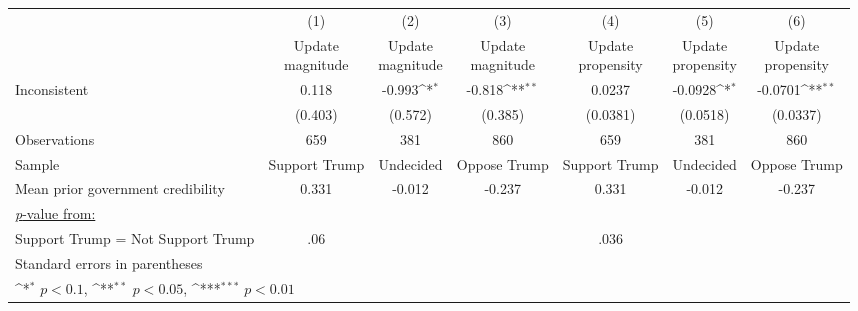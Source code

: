 {
\def\sym#1{\ifmmode^{#1}\else\(^{#1}\)\fi}
\begin{tabular}{l*{6}{c}}
\hline\hline
                    &\multicolumn{1}{c}{(1)}         &\multicolumn{1}{c}{(2)}         &\multicolumn{1}{c}{(3)}         &\multicolumn{1}{c}{(4)}         &\multicolumn{1}{c}{(5)}         &\multicolumn{1}{c}{(6)}         \\
                    &\shortstack{Update \\ magnitude}         &\shortstack{Update \\ magnitude}         &\shortstack{Update \\ magnitude}         &\shortstack{Update \\ propensity}         &\shortstack{Update \\ propensity}         &\shortstack{Update \\ propensity}         \\
\hline
Inconsistent        &       0.118         &      -0.993\sym{*}  &      -0.818\sym{**} &      0.0237         &     -0.0928\sym{*}  &     -0.0701\sym{**} \\
                    &     (0.403)         &     (0.572)         &     (0.385)         &    (0.0381)         &    (0.0518)         &    (0.0337)         \\
\hline
Observations        &         659         &         381         &         860         &         659         &         381         &         860         \\
Sample              &Support Trump         &   Undecided         &Oppose Trump         &Support Trump         &   Undecided         &Oppose Trump         \\
Mean prior government credibility&       0.331         &      -0.012         &      -0.237         &       0.331         &      -0.012         &      -0.237         \\
\ul{\textit{p}-value from:}&                     &                     &                     &                     &                     &                     \\
Support Trump = Not Support Trump&         .06         &                     &                     &        .036         &                     &                     \\
\hline\hline
\multicolumn{7}{l}{\footnotesize Standard errors in parentheses}\\
\multicolumn{7}{l}{\footnotesize \sym{*} \(p<0.1\), \sym{**} \(p<0.05\), \sym{***} \(p<0.01\)}\\
\end{tabular}
}
